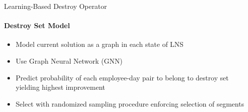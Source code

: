 \documentclass[aspectratio=1610]{beamer}
\newcommand{\important}[1]{{\color{green!60!black}#1}}
\begin{document}
\begin{frame}{Learning-Based Destroy Operator}
    \framesubtitle{Destroy Set Model}
    \begin{itemize}
    	\item Model current solution as a \important{graph} in each state of LNS
    	\item Use \important{Graph Neural Network (GNN)} \cite{scarselli2008graph}
		\item Predict \important{probability} of each employee-day pair to \important{belong to destroy set yielding highest improvement}
		\item Select with randomized sampling procedure enforcing selection of segments
	\end{itemize}


\end{frame}
\end{document}
